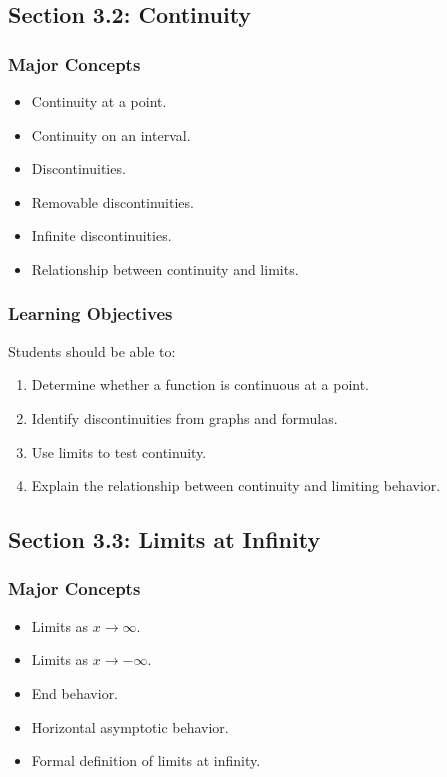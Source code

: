 \documentclass[11pt]{article}
\begin{document}
\subsection{Section 3.2: Continuity}

\subsubsection{Major Concepts}

\begin{itemize}
    \item Continuity at a point.
    \item Continuity on an interval.
    \item Discontinuities.
    \item Removable discontinuities.
    \item Infinite discontinuities.
    \item Relationship between continuity and limits.
\end{itemize}

\subsubsection{Learning Objectives}

Students should be able to:

\begin{enumerate}
    \item Determine whether a function is continuous at a point.
    \item Identify discontinuities from graphs and formulas.
    \item Use limits to test continuity.
    \item Explain the relationship between continuity and limiting behavior.
\end{enumerate}

\subsection{Section 3.3: Limits at Infinity}

\subsubsection{Major Concepts}

\begin{itemize}
    \item Limits as $x \to \infty$.
    \item Limits as $x \to -\infty$.
    \item End behavior.
    \item Horizontal asymptotic behavior.
    \item Formal definition of limits at infinity.
\end{itemize}
\end{document}

